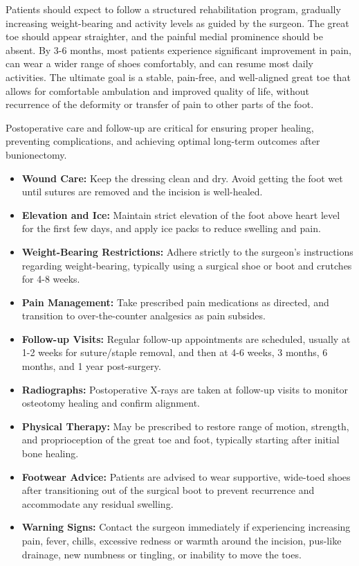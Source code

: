 Patients should expect to follow a structured rehabilitation program, gradually increasing weight-bearing and activity levels as guided by the surgeon. The great toe should appear straighter, and the painful medial prominence should be absent. By 3-6 months, most patients experience significant improvement in pain, can wear a wider range of shoes comfortably, and can resume most daily activities. The ultimate goal is a stable, pain-free, and well-aligned great toe that allows for comfortable ambulation and improved quality of life, without recurrence of the deformity or transfer of pain to other parts of the foot.

Postoperative care and follow-up are critical for ensuring proper healing, preventing complications, and achieving optimal long-term outcomes after bunionectomy.

\begin{itemize}
  \item \textbf{Wound Care:} Keep the dressing clean and dry. Avoid getting the foot wet until sutures are removed and the incision is well-healed.
  \item \textbf{Elevation and Ice:} Maintain strict elevation of the foot above heart level for the first few days, and apply ice packs to reduce swelling and pain.
  \item \textbf{Weight-Bearing Restrictions:} Adhere strictly to the surgeon's instructions regarding weight-bearing, typically using a surgical shoe or boot and crutches for 4-8 weeks.
  \item \textbf{Pain Management:} Take prescribed pain medications as directed, and transition to over-the-counter analgesics as pain subsides.
  \item \textbf{Follow-up Visits:} Regular follow-up appointments are scheduled, usually at 1-2 weeks for suture/staple removal, and then at 4-6 weeks, 3 months, 6 months, and 1 year post-surgery.
  \item \textbf{Radiographs:} Postoperative X-rays are taken at follow-up visits to monitor osteotomy healing and confirm alignment.
  \item \textbf{Physical Therapy:} May be prescribed to restore range of motion, strength, and proprioception of the great toe and foot, typically starting after initial bone healing.
  \item \textbf{Footwear Advice:} Patients are advised to wear supportive, wide-toed shoes after transitioning out of the surgical boot to prevent recurrence and accommodate any residual swelling.
  \item \textbf{Warning Signs:} Contact the surgeon immediately if experiencing increasing pain, fever, chills, excessive redness or warmth around the incision, pus-like drainage, new numbness or tingling, or inability to move the toes.
\end{itemize}

